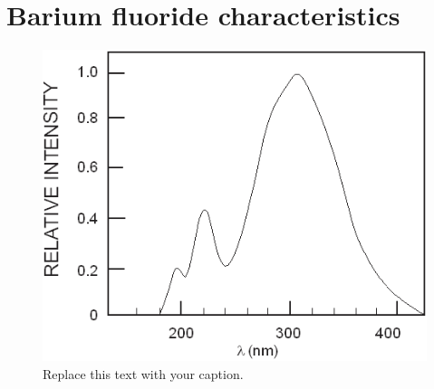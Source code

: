 \section{Barium fluoride characteristics}

\begin{figure}[h!]
\begin{center}
\includegraphics[width=0.7\columnwidth]{Figures/spectrum.png}
\caption{Replace this text with your caption.}
\end{center}
\end{figure}